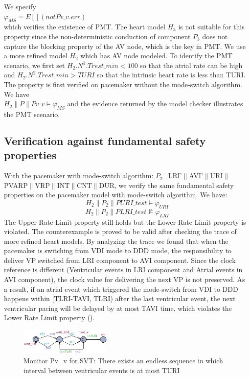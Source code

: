 We specify\\
$\varphi_{MS}=E[] (not Pv\_v.err)$\\
which verifies the existence of PMT. The heart model $H_3$ is not suitable for this property since the non-deterministic conduction of component $P_3$ does not capture the blocking property of the AV node, which is the key in PMT. We use a more refined model $H_2$ which has AV node modeled. To identify the PMT scenario, we first set $H_2.N^1.Trest\_min<100$ so that the atrial rate can be high and $H_2.N^2.Trest\_min>TURI$ so that the intrinsic heart rate is less than TURI. The property is first verified on pacemaker without the mode-switch algorithm. We have\\
$H_2\|P\|Pv\_v\models\varphi_{MS}$
and the evidence returned by the model checker illustrates the PMT scenario.

\subsection{Verification against fundamental safety properties}
With the pacemaker with mode-switch algorithm: $P_2$=\textsf{LRI'$\|$AVI'$\|$URI$\|$PVARP$\|$VRP$\|$INT$\|$CNT$\|$DUR}, we verify the same fundamental safety properties on the pacemaker model with mode-switch algorithm. We have:
$$H_2\|P_2\|PURI\_test\models\varphi_{URI}$$
$$H_2\|P_2\|PLRI\_test\not\models\varphi_{LRI}$$
The Upper Rate Limit property still holds but the Lower Rate Limit property is violated. The counterexample is proved to be valid after checking the trace of more refined heart models. By analyzing the trace we found that when the pacemaker is switching from VDI mode to DDD mode, the responsibility to deliver VP switched from LRI component to AVI component. Since the clock reference is different (Ventricular events in LRI component and Atrial events in AVI component), the clock value for delivering the next VP is not preserved. As a result, if an atrial event which triggered the mode-switch from VDI to DDD happens within [TLRI-TAVI, TLRI) after the last ventricular event, the next ventricular pacing will be delayed by at most TAVI time, which violates the Lower Rate Limit property (). 
\begin{figure}
		\centering
		\includegraphics[width=0.4\textwidth]{figs/vv.pdf}
		\caption{\small Monitor \textsf{Pv\_v} for SVT: There exists an endless sequence in which interval between ventricular events is at most TURI}
		\label{fig:vv}
\end{figure}
